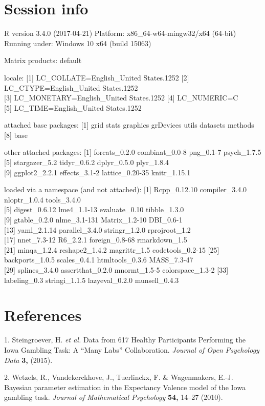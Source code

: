\documentclass[,]{article}
\begin{document}
\newpage

\section{Session info}\label{session-info}

R version 3.4.0 (2017-04-21) Platform: x86\_64-w64-mingw32/x64 (64-bit)
Running under: Windows 10 x64 (build 15063)

Matrix products: default

locale: {[}1{]} LC\_COLLATE=English\_United States.1252 {[}2{]}
LC\_CTYPE=English\_United States.1252\\
{[}3{]} LC\_MONETARY=English\_United States.1252 {[}4{]} LC\_NUMERIC=C\\
{[}5{]} LC\_TIME=English\_United States.1252

attached base packages: {[}1{]} grid stats graphics grDevices utils
datasets methods\\
{[}8{]} base

other attached packages: {[}1{]} forcats\_0.2.0 combinat\_0.0-8
png\_0.1-7 psych\_1.7.5\\
{[}5{]} stargazer\_5.2 tidyr\_0.6.2 dplyr\_0.5.0 plyr\_1.8.4\\
{[}9{]} ggplot2\_2.2.1 effects\_3.1-2 lattice\_0.20-35 knitr\_1.15.1

loaded via a namespace (and not attached): {[}1{]} Rcpp\_0.12.10
compiler\_3.4.0 nloptr\_1.0.4 tools\_3.4.0\\
{[}5{]} digest\_0.6.12 lme4\_1.1-13 evaluate\_0.10 tibble\_1.3.0\\
{[}9{]} gtable\_0.2.0 nlme\_3.1-131 Matrix\_1.2-10 DBI\_0.6-1\\
{[}13{]} yaml\_2.1.14 parallel\_3.4.0 stringr\_1.2.0 rprojroot\_1.2\\
{[}17{]} nnet\_7.3-12 R6\_2.2.1 foreign\_0.8-68 rmarkdown\_1.5\\
{[}21{]} minqa\_1.2.4 reshape2\_1.4.2 magrittr\_1.5 codetools\_0.2-15
{[}25{]} backports\_1.0.5 scales\_0.4.1 htmltools\_0.3.6 MASS\_7.3-47\\
{[}29{]} splines\_3.4.0 assertthat\_0.2.0 mnormt\_1.5-5
colorspace\_1.3-2 {[}33{]} labeling\_0.3 stringi\_1.1.5 lazyeval\_0.2.0
munsell\_0.4.3

\section*{References}\label{references}

\hypertarget{refs}{}
\hypertarget{ref-steingroever_data_2015}{}
1. Steingroever, H. \emph{et al.} Data from 617 Healthy Participants
Performing the Iowa Gambling Task: A ``Many Labs'' Collaboration.
\emph{Journal of Open Psychology Data} \textbf{3,} (2015).

\hypertarget{ref-wetzels_bayesian_2010}{}
2. Wetzels, R., Vandekerckhove, J., Tuerlinckx, F. \& Wagenmakers, E.-J.
Bayesian parameter estimation in the Expectancy Valence model of the
Iowa gambling task. \emph{Journal of Mathematical Psychology}
\textbf{54,} 14--27 (2010).
\end{document}
